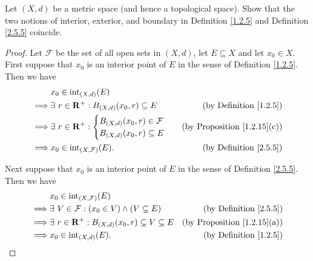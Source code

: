 \begin{exercise}\label{ex 2.5.3}
    Let \((X, d)\) be a metric space (and hence a topological space).
    Show that the two notions of interior, exterior, and boundary in Definition
    \ref{1.2.5} and Definition \ref{2.5.5} coincide.
\end{exercise}

\begin{proof}
    Let \(\mathcal{F}\) be the set of all open sets in \((X, d)\), let \(E \subseteq X\) and let \(x_0 \in X\).
    First suppose that \(x_0\) is an interior point of \(E\) in the sense of Definition \ref{1.2.5}.
    Then we have
    \begin{align*}
                 & x_0 \in \text{int}_{(X, d)}(E)                                                                       \\
        \implies & \exists\ r \in \mathbf{R}^+ : B_{(X, d)}(x_0, r) \subseteq E & \text{(by Definition \ref{1.2.5})}    \\
        \implies & \exists\ r \in \mathbf{R}^+ : \begin{cases}
                                                     B_{(X, d)}(x_0, r) \in \mathcal{F} \\
                                                     B_{(X, d)}(x_0, r) \subseteq E
                                                 \end{cases}                  & \text{(by Proposition \ref{1.2.15}(c))} \\
        \implies & x_0 \in \text{int}_{(X, \mathcal{F})}(E).                    & \text{(by Definition \ref{2.5.5})}
    \end{align*}

    Next suppose that \(x_0\) is an interior point of \(E\) in the sense of Definition \ref{2.5.5}.
    Then we have
    \begin{align*}
                 & x_0 \in \text{int}_{(X, \mathcal{F})}(E)                                                                           \\
        \implies & \exists\ V \in \mathcal{F} : (x_0 \in V) \land (V \subseteq E)           & \text{(by Definition \ref{2.5.5})}      \\
        \implies & \exists\ r \in \mathbf{R}^+ : B_{(X, d)}(x_0, r) \subseteq V \subseteq E & \text{(by Proposition \ref{1.2.15}(a))} \\
        \implies & x_0 \in \text{int}_{(X, d)}(E).                                          & \text{(by Definition \ref{1.2.5})}
    \end{align*}


\end{proof}
